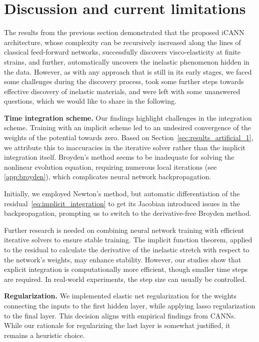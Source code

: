 \section{Discussion and current limitations}
\label{sec:discussion}
%
The results from the previous section demonstrated that the proposed iCANN architecture, whose complexity can be recursively increased along the lines of classical feed-forward networks, successfully discovers visco-elasticity at finite strains, and further, automatically uncovers the inelastic phenomenon hidden in the data. 
However, as with any approach that is still in its early stages, we faced some challenges during the discovery process, took some further steps towards effective discovery of inelastic materials, and were left with some unanswered questions, which we would like to share in the following.\newline

\textbf{Time integration scheme.} Our findings highlight challenges in the integration scheme. 
Training with an implicit scheme led to an undesired convergence of the weights of the potential towards zero.
Based on Section~\ref{sec:results_artificial_1}, we attribute this to inaccuracies in the iterative solver rather than the implicit integration itself. 
Broyden's method seems to be inadequate for solving the nonlinear evolution equation, requiring numerous local iterations (see \ref{app:broyden}), which complicates neural network backpropagation.

Initially, we employed Newton’s method, but automatic differentiation of the residual~\eqref{eq:implicit_integration} to get its Jacobian introduced issues in the backpropagation, prompting us to switch to the derivative-free Broyden method.

Further research is needed on combining neural network training with efficient iterative solvers to ensure stable training. 
The implicit function theorem, applied to the residual to calculate the derivative of the inelastic stretch with respect to the network's weights, may enhance stability. 
However, our studies show that explicit integration is computationally more efficient, though smaller time steps are required.
In real-world experiments, the step size can usually be controlled.\newline

\textbf{Regularization.} We implemented elastic net regularization for the weights connecting the inputs to the first hidden layer, while applying lasso regularization to the final layer. 
This decision aligns with empirical findings from CANNs. 
While our rationale for regularizing the last layer is somewhat justified, it remains a heuristic choice.

